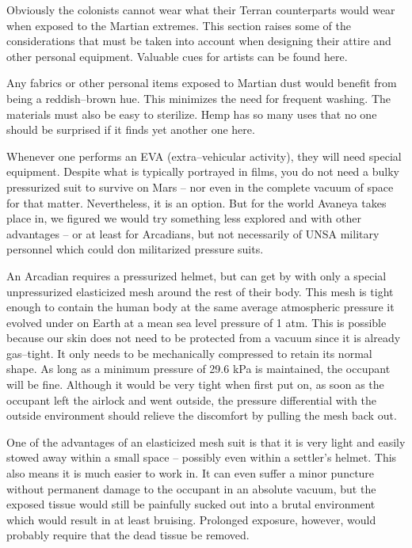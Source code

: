

Obviously the colonists cannot wear what their Terran counterparts would wear when exposed to the Martian extremes. This section raises some of the considerations that must be taken into account when designing their attire and other personal equipment. Valuable cues for artists can be found here.

Any fabrics or other personal items exposed to Martian dust would benefit from being a reddish--brown hue. This minimizes the need for frequent washing. The materials must also be easy to sterilize. Hemp has so many uses that no one should be surprised if it finds yet another one here.

Whenever one performs an EVA (extra--vehicular activity), they will need special equipment. Despite what is typically portrayed in films, you do not need a bulky pressurized suit to survive on Mars -- nor even in the complete vacuum of space for that matter. Nevertheless, it is an option. But for the world Avaneya takes place in, we figured we would try something less explored and with other advantages -- or at least for Arcadians, but not necessarily of UNSA military personnel which could don militarized pressure suits.

An Arcadian requires a pressurized helmet, but can get by with only a special unpressurized elasticized mesh around the rest of their body. This mesh is tight enough to contain the human body at the same average atmospheric pressure it evolved under on Earth at a mean sea level pressure of 1 atm. This is possible because our skin does not need to be protected from a vacuum since it is already gas--tight. It only needs to be mechanically compressed to retain its normal shape. As long as a minimum pressure of 29.6 kPa is maintained, the occupant will be fine. Although it would be very tight when first put on, as soon as the occupant left the airlock and went outside, the pressure differential with the outside environment should relieve the discomfort by pulling the mesh back out.

One of the advantages of an elasticized mesh suit is that it is very light and easily stowed away within a small space -- possibly even within a settler's helmet. This also means it is much easier to work in. It can even suffer a minor puncture without permanent damage to the occupant in an absolute vacuum, but the exposed tissue would still be painfully sucked out into a brutal environment which would result in at least bruising. Prolonged exposure, however, would probably require that the dead tissue be removed.

